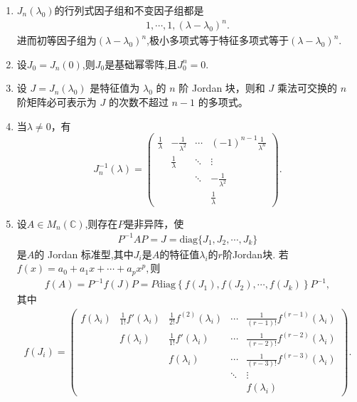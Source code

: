 \documentclass[../../main.tex]{subfiles}
\begin{document}
\begin{proposition}[Jordan块的性质]\label{proposition:Jordan块的性质}
\begin{enumerate}[(1)]
\item $J_n(\lambda_0)$的行列式因子组和不变因子组都是
\begin{align*}
1,\cdots,1,(\lambda-\lambda_0)^n.
\end{align*}
进而初等因子组为$(\lambda-\lambda_0)^n$,极小多项式等于特征多项式等于$(\lambda-\lambda_0)^n$.

\item 设$J_0=J_n(0)$,则$J_0$是基础幂零阵,且$J_0^n=0.$

\item 设 $J = J_n(\lambda_0)$ 是特征值为 $\lambda_0$ 的 $n$ 阶 Jordan 块，则和 $J$ 乘法可交换的 $n$ 阶矩阵必可表示为 $J$ 的次数不超过 $n - 1$ 的多项式。

\item 当$\lambda\neq 0$，有
\[
J_n^{-1}(\lambda)=
\begin{pmatrix}
\frac{1}{\lambda} & -\frac{1}{\lambda^2} & \cdots & (-1)^{n - 1}\frac{1}{\lambda^n} \\
 & \frac{1}{\lambda} & \ddots & \vdots \\
 &  & \ddots & -\frac{1}{\lambda^2} \\
 &  &  & \frac{1}{\lambda}
\end{pmatrix}.
\]

\item 设$A\in M_n(\mathbb{C})$,则存在\(P\)是非异阵，使
\begin{align*}
P^{-1}AP = J = \mathrm{diag}\{J_1,J_2,\cdots,J_k\}
\end{align*}
是\(A\)的 Jordan 标准型,其中$J_i$是$A$的特征值$\lambda_i$的$r$阶Jordan块.
若$f(x)=a_0+a_1x+\cdots+a_px^p,$则
\begin{align*}
f(A)=P^{-1}f(J)P=P\mathrm{diag}\left\{ f\left( J_1 \right) ,f\left( J_2 \right) ,\cdots ,f\left( J_k \right) \right\} P^{-1},
\end{align*}
其中
\begin{align*}
f(J_i)= \begin{pmatrix}
f(\lambda_i) & \frac{1}{1!}f'(\lambda_i) & \frac{1}{2!}f^{(2)}(\lambda_i) & \cdots & \frac{1}{(r - 1)!}f^{(r - 1)}(\lambda_i) \\
 & f(\lambda_i) & \frac{1}{1!}f'(\lambda_i) & \cdots & \frac{1}{(r - 2)!}f^{(r - 2)}(\lambda_i) \\
 & & f(\lambda_i) & \cdots & \frac{1}{(r - 3)!}f^{(r - 3)}(\lambda_i) \\
 & & & \ddots & \vdots \\
 & & & & f(\lambda_i)
\end{pmatrix}. 
\end{align*}
\end{enumerate}
\end{proposition}
\end{document}
